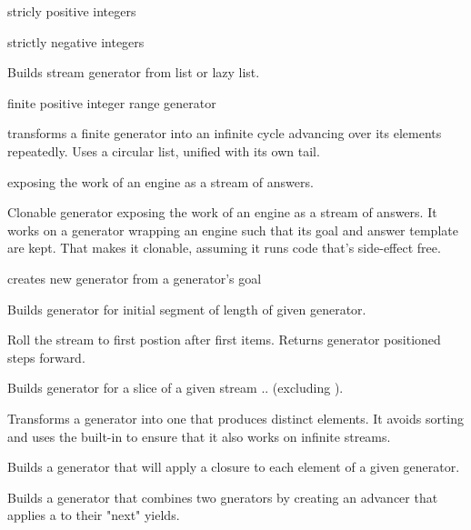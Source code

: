 \documentclass[11pt]{article}
\begin{document}
\begin{description}
stricly positive integers

strictly negative integers

Builds stream generator from list or lazy list. 

finite positive integer range generator

transforms a finite generator into an infinite cycle
advancing over its elements repeatedly.
Uses a circular list, unified with its own tail.

 exposing the work of an engine as a stream of answers. 

Clonable generator exposing the work of an engine as a stream of answers.
It works on a generator wrapping an engine
such that its goal and answer template are kept.
That makes it clonable, assuming it runs code that's side-effect free.

creates new generator from a generator's goal

Builds generator for initial segment of length  of given generator. 

Roll the stream to first postion after first  items.
Returns generator positioned  steps forward.

Builds generator for a slice of a given stream .. (excluding ).

Transforms a generator into one that produces distinct elements.
It avoids sorting and uses the built-in  to ensure
that it also works on infinite streams.

Builds a generator that will apply a closure to each element of a given generator.

Builds a generator that combines two gnerators by creating
an advancer that applies a  to their "next" yields.


\end{description}
\end{document}
